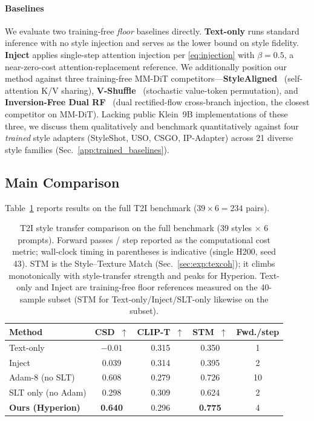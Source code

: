 \paragraph{Baselines}
We evaluate two training-free \emph{floor} baselines directly.
\textbf{Text-only} runs standard inference with no style injection and serves as
the lower bound on style fidelity.
\textbf{Inject} applies single-step attention injection per
\cref{eq:injection} with $\beta=0.5$, a near-zero-cost
attention-replacement reference.
We additionally position our method against three training-free MM-DiT
competitors---\textbf{StyleAligned}~\cite{hertz2024style} (self-attention K/V
sharing), \textbf{V-Shuffle}~\cite{vshuffle2025} (stochastic value-token
permutation), and \textbf{Inversion-Free Dual RF}~\cite{dualrf2025} (dual
rectified-flow cross-branch injection, the closest competitor on MM-DiT).
Lacking public Klein~9B implementations of these three, we discuss them
qualitatively and benchmark quantitatively against four \emph{trained} style
adapters (StyleShot, USO, CSGO, IP-Adapter) across 21 diverse style families
(Sec.~\ref{app:trained_baselines}).

\subsection{Main Comparison}
\label{sec:exp:main}

Table~\ref{tab:main} reports results on the full T2I benchmark
($39 \times 6 = 234$ pairs).

\begin{table}[t]
  \centering
  \caption{%
    T2I style transfer comparison on the full benchmark (39 styles $\times$ 6 prompts).
    Forward passes / step reported as the computational cost metric;
    wall-clock timing in parentheses is indicative (single H200, seed 43).
    STM is the Style--Texture Match (Sec.~\ref{sec:exp:texcoh}); it climbs
    monotonically with style-transfer strength and peaks for Hyperion.
    Text-only and Inject are training-free floor references measured on the
    40-sample subset (STM for Text-only/Inject/SLT-only likewise on the subset).%
  }
  \label{tab:main}
  \begin{tabular}{lcccc}
    \toprule
    Method & CSD~$\uparrow$ & CLIP-T~$\uparrow$ & STM~$\uparrow$ & Fwd./step \\
    \midrule
    Text-only                & $-0.01$ & 0.315   & 0.350 & 1 \\
    Inject                   & 0.039   & 0.314   & 0.395 & 2 \\
    \midrule
    Adam-8 (no SLT)                & 0.608   & 0.279   & 0.726 & 10 \\
    SLT only (no Adam)             & 0.298   & 0.309   & 0.624 & 2  \\
    \rowcolor{tabshade!10}
    \textbf{Ours (Hyperion)}         & \textbf{0.640} & 0.296 & \textbf{0.775} & 4 \\
    \bottomrule
  \end{tabular}
\end{table}

